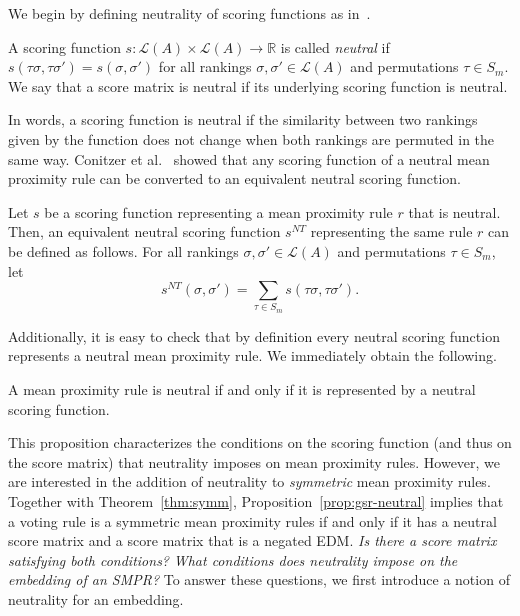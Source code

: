 \documentclass[prodmode]{acmsmall-ec14}
\newcommand{\calL}{{\mathcal{L}}}
\newcommand{\rank}{{\calL(A)}}
\newcommand{\nt}{NT}
\begin{document}
We begin by defining neutrality of scoring functions as in~\cite{CRX09}. 

\begin{definition}
A scoring function $s: \rank \times \rank \rightarrow \mathbb{R}$ is called \emph{neutral} if $s(\tau \sigma, \tau \sigma') = s(\sigma,\sigma')$ for all rankings $\sigma,\sigma' \in \rank$ and permutations $\tau \in S_m$. We say that a score matrix is neutral if its underlying scoring function is neutral. 
\end{definition}
In words, a scoring function is neutral if the similarity between two rankings given by the function does not change when both rankings are permuted in the same way. Conitzer et al.~ showed that any scoring function of a neutral mean proximity rule can be converted to an equivalent neutral scoring function.

\begin{proposition} Let $s$ be a scoring function representing a mean proximity rule $r$ that is neutral. Then, an equivalent neutral scoring function $s^{\nt}$ representing the same rule $r$ can be defined as follows. For all rankings $\sigma,\sigma' \in \rank$ and permutations $\tau \in S_m$, let
\begin{equation}
s^{\nt}(\sigma,\sigma') = \sum_{\tau \in S_m} s(\tau \sigma, \tau \sigma').
\label{eqn:s-nt}
\end{equation}
\label{prop:neutral-scoring}
\end{proposition}
%
Additionally, it is easy to check that by definition every neutral scoring function represents a neutral mean proximity rule. We immediately obtain the following.
 
\begin{proposition}
A mean proximity rule is neutral if and only if it is represented by a neutral scoring function.
\label{prop:gsr-neutral}
\end{proposition}
%
This proposition characterizes the conditions on the scoring function (and thus on the score matrix) that neutrality imposes on mean proximity rules. However, we are interested in the addition of neutrality to \emph{symmetric} mean proximity rules. Together with Theorem~\ref{thm:symm}, Proposition~\ref{prop:gsr-neutral} implies that a voting rule is a symmetric mean proximity rules if and only if it has a neutral score matrix and a score matrix that is a negated EDM. \emph{Is there a score matrix satisfying both conditions?} \emph{What conditions does neutrality impose on the embedding of an SMPR?} To answer these questions, we first introduce a notion of neutrality for an embedding.
\end{document}
